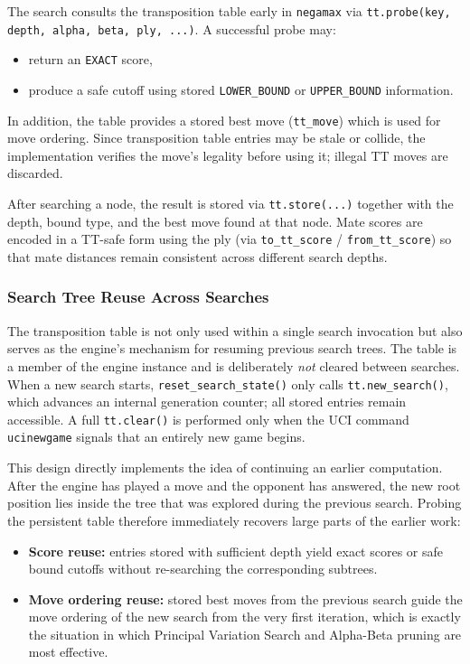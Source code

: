 The search consults the transposition table early in \texttt{negamax} via
\texttt{tt.probe(key, depth, alpha, beta, ply, ...)}. A successful probe may:
\begin{itemize}
    \item return an \texttt{EXACT} score,
    \item produce a safe cutoff using stored \texttt{LOWER\_BOUND} or
    \texttt{UPPER\_BOUND} information.
\end{itemize}

In addition, the table provides a stored best move (\texttt{tt\_move}) which is
used for move ordering. Since transposition table entries may be stale or collide,
the implementation verifies the move's legality before using it; illegal TT moves
are discarded.

After searching a node, the result is stored via \texttt{tt.store(...)} together
with the depth, bound type, and the best move found at that node. Mate scores are
encoded in a TT-safe form using the ply (via \texttt{to\_tt\_score} /
\texttt{from\_tt\_score}) so that mate distances remain consistent across
different search depths.

\subsubsection{Search Tree Reuse Across Searches}
\label{subsec:tree_reuse}

The transposition table is not only used within a single search invocation but
also serves as the engine's mechanism for resuming previous search trees. The
table is a member of the engine instance and is deliberately \emph{not} cleared
between searches. When a new search starts, \texttt{reset\_search\_state()}
only calls \texttt{tt.new\_search()}, which advances an internal generation
counter; all stored entries remain accessible. A full \texttt{tt.clear()} is
performed only when the UCI command \texttt{ucinewgame} signals that an
entirely new game begins.

This design directly implements the idea of continuing an earlier computation.
After the engine has played a move and the opponent has answered, the new root
position lies inside the tree that was explored during the previous search.
Probing the persistent table therefore immediately recovers large parts of the
earlier work:
\begin{itemize}
    \item \textbf{Score reuse:} entries stored with sufficient depth yield
    exact scores or safe bound cutoffs without re-searching the corresponding
    subtrees.
    \item \textbf{Move ordering reuse:} stored best moves from the previous
    search guide the move ordering of the new search from the very first
    iteration, which is exactly the situation in which Principal Variation
    Search and Alpha-Beta pruning are most effective.
\end{itemize}

